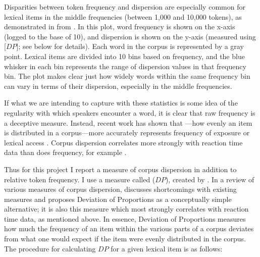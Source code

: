Disparities between token frequency and dispersion are especially common for lexical items in the middle frequencies (between 1,000 and 10,000 tokens), as demonstrated in  from \textcite[112]{Gries2021}. In this plot, word frequency is shown on the x-axis (logged to the base of 10), and dispersion is shown on the y-axis (measured using  [$DP$]; see below for details). Each word in the corpus is represented by a gray point. Lexical items are divided into 10 bins based on frequency, and the blue whisker in each bin represents the range of dispersion values in that frequency bin. The plot makes clear just how widely words within the same frequency bin can vary in terms of their dispersion, especially in the middle frequencies.

If what we are intending to capture with these statistics is some idea of the regularity with which speakers encounter a word, it is clear that raw frequency is a deceptive measure. Instead, recent work has shown that —how evenly an item is distributed in a corpus—more accurately represents frequency of exposure or lexical access \parencites{Gries2008}{Gries2010}{Griesfc}. Corpus dispersion correlates more strongly with reaction time data than does frequency, for example \parencite{Griesfc}.

Thus for this project I report a measure of corpus dispersion in addition to relative token frequency. I use a measure called  ($DP$), created by \textcite{Gries2008}. In a review of various measures of corpus dispersion, \textcite{Gries2008} discusses shortcomings with existing measures and proposes Deviation of Proportions as a conceptually simple alternative; it is also this measure which most strongly correlates with reaction time data, as mentioned above. In essence, Deviation of Proportions measures how much the frequency of an item within the various parts of a corpus deviates from what one would expect if the item were evenly distributed in the corpus. The procedure for calculating $DP$ for a given lexical item is as follows:


